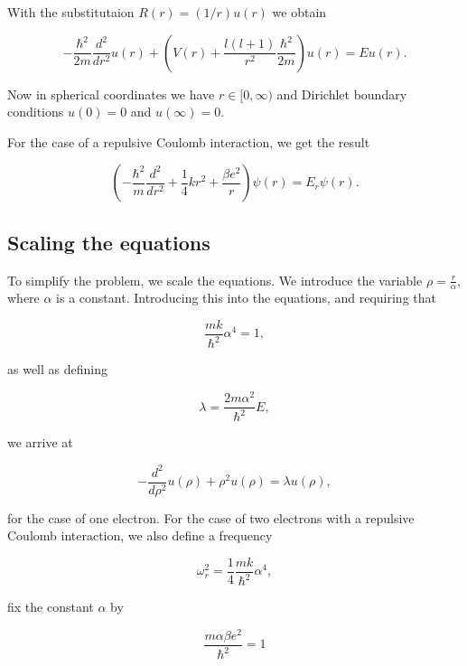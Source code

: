\documentclass{emulateapj}
\begin{document}
With the substitutaion $R(r) = (1/r) u(r)$ we obtain

\begin{equation}
  -\frac{\hbar^2}{2 m} \frac{d^2}{dr^2} u(r)
       + \left ( V(r) + \frac{l (l + 1)}{r^2}\frac{\hbar^2}{2 m}
                                    \right ) u(r)  = E u(r) .
\end{equation}

Now in spherical coordinates we have $r\in [0,\infty)$ and Dirichlet boundary conditions $u(0)=0$ and $u(\infty)=0$.

For the case of a repulsive Coulomb interaction, we get the result

\begin{equation}
\left(  -\frac{\hbar^2}{m} \frac{d^2}{dr^2}+ \frac{1}{4}k r^2+\frac{\beta e^2}{r}\right)\psi(r)  = E_r \psi(r).
\end{equation}

\subsection{Scaling the equations}
To simplify the problem, we scale the equations. We introduce the variable $\rho = \frac{r}{\alpha}$, where $\alpha$ is a constant. Introducing this into the equations, and requiring that

\begin{equation}
\frac{mk}{\hbar^2} \alpha^4 = 1,
\end{equation}

 as well as defining

 \begin{equation}
\lambda = \frac{2m\alpha^2}{\hbar^2}E,
\end{equation}

we arrive at

\begin{equation}
  -\frac{d^2}{d\rho^2} u(\rho) + \rho^2u(\rho)  = \lambda u(\rho),
\end{equation}

for the case of one electron. For the case of two electrons with a repulsive Coulomb interaction, we also define a frequency

\begin{equation}
\omega_r^2=\frac{1}{4}\frac{mk}{\hbar^2} \alpha^4,
\end{equation}

fix the constant $\alpha$ by

\begin{equation}
\frac{m\alpha \beta e^2}{\hbar^2}=1
\end{equation}
\end{document}
